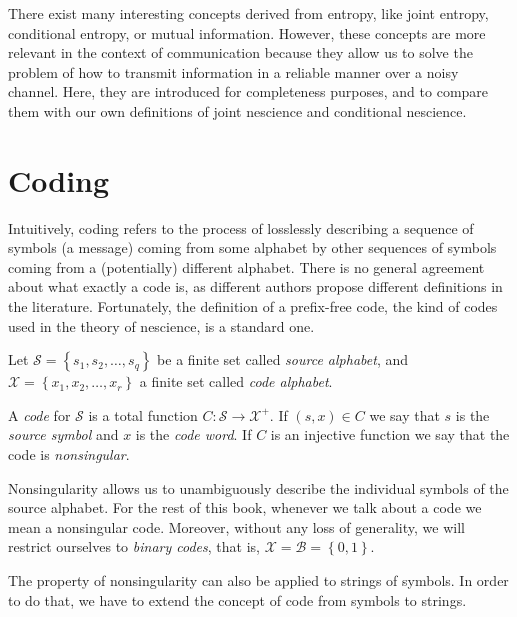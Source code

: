 There exist many interesting concepts derived from entropy, like joint entropy, conditional entropy, or mutual information. However, these concepts are more relevant in the context of communication because they allow us to solve the problem of how to transmit information in a reliable manner over a noisy channel. Here, they are introduced for completeness purposes, and to compare them with our own definitions of joint nescience and conditional nescience.

%
%

\section{Coding}
\label{Codes}

Intuitively, coding refers to the process of losslessly describing a sequence of symbols (a message) coming from some alphabet by other sequences of symbols coming from a (potentially) different alphabet. There is no general agreement about what exactly a code is, as different authors propose different definitions in the literature. Fortunately, the definition of a prefix-free code, the kind of codes used in the theory of nescience, is a standard one.

Let $\mathcal{S}=\left\{ s_{1},s_{2},\ldots,s_{q}\right\}$ be a finite set called \emph{source alphabet}, and $\mathcal{X}=\left\{ x_{1}, x_{2}, \ldots, x_{r} \right\}$ a finite set called \emph{code alphabet}.

\begin{definition}[Code]
A \emph{code} for $\mathcal{S}$ is a total function $C:\mathcal{S}\rightarrow\mathcal{X}^{+}$. If $(s,x) \in C$ we say that $s$ is the \emph{source symbol} and $x$ is the \emph{code word}. If $C$ is an injective function we say that the code is \emph{nonsingular}.
\end{definition}

Nonsingularity allows us to unambiguously describe the individual symbols of the source alphabet. For the rest of this book, whenever we talk about a code we mean a nonsingular code. Moreover, without any loss of generality, we will restrict ourselves to \emph{binary codes}, that is, $\mathcal{X} = \mathcal{B} = \left\{0, 1\right\}$.

The property of nonsingularity can also be applied to strings of symbols. In order to do that, we have to extend the concept of code from symbols to strings.

